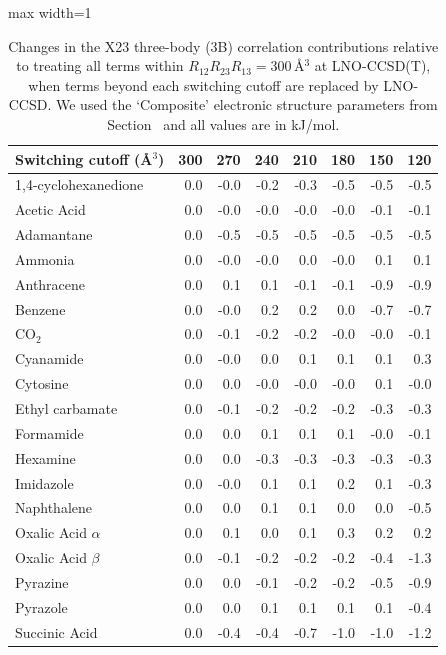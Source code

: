\begin{table}[h]
\centering
\caption{\label{tab:x23_3b_multilevel_ccsd}Changes in the X23 three-body (3B) correlation contributions relative to treating all terms within $R_{12}R_{23}R_{13}=300\,$\AA{}$^3$ at LNO-CCSD(T), when terms beyond each switching cutoff are replaced by LNO-CCSD. We used the `Composite' electronic structure parameters from Section~ and all values are in kJ/mol.}
\begin{adjustbox}{max width=1\textwidth}
\begin{tabular}{lrrrrrrr}
\toprule
Switching cutoff (\AA{}$^3$) & 300 & 270 & 240 & 210 & 180 & 150 & 120 \\ 
\midrule
1,4-cyclohexanedione & 0.0 & -0.0 & -0.2 & -0.3 & -0.5 & -0.5 & -0.5 \\
Acetic Acid & 0.0 & -0.0 & -0.0 & -0.0 & -0.0 & -0.1 & -0.1 \\
Adamantane & 0.0 & -0.5 & -0.5 & -0.5 & -0.5 & -0.5 & -0.5 \\
Ammonia & 0.0 & -0.0 & -0.0 & 0.0 & -0.0 & 0.1 & 0.1 \\
Anthracene & 0.0 & 0.1 & 0.1 & -0.1 & -0.1 & -0.9 & -0.9 \\
Benzene & 0.0 & -0.0 & 0.2 & 0.2 & 0.0 & -0.7 & -0.7 \\
CO$_2$ & 0.0 & -0.1 & -0.2 & -0.2 & -0.0 & -0.0 & -0.1 \\
Cyanamide & 0.0 & -0.0 & 0.0 & 0.1 & 0.1 & 0.1 & 0.3 \\
Cytosine & 0.0 & 0.0 & -0.0 & -0.0 & -0.0 & 0.1 & -0.0 \\
Ethyl carbamate & 0.0 & -0.1 & -0.2 & -0.2 & -0.2 & -0.3 & -0.3 \\
Formamide & 0.0 & 0.0 & 0.1 & 0.1 & 0.1 & -0.0 & -0.1 \\
Hexamine & 0.0 & 0.0 & -0.3 & -0.3 & -0.3 & -0.3 & -0.3 \\
Imidazole & 0.0 & -0.0 & 0.1 & 0.1 & 0.2 & 0.1 & -0.3 \\
Naphthalene & 0.0 & 0.0 & 0.1 & 0.1 & 0.0 & 0.0 & -0.5 \\
Oxalic Acid $\alpha$ & 0.0 & 0.1 & 0.0 & 0.1 & 0.3 & 0.2 & 0.2 \\
Oxalic Acid $\beta$ & 0.0 & -0.1 & -0.2 & -0.2 & -0.2 & -0.4 & -1.3 \\
Pyrazine & 0.0 & 0.0 & -0.1 & -0.2 & -0.2 & -0.5 & -0.9 \\
Pyrazole & 0.0 & 0.0 & 0.1 & 0.1 & 0.1 & 0.1 & -0.4 \\
Succinic Acid & 0.0 & -0.4 & -0.4 & -0.7 & -1.0 & -1.0 & -1.2 \\

\end{tabular}
\end{adjustbox}
\end{table}
